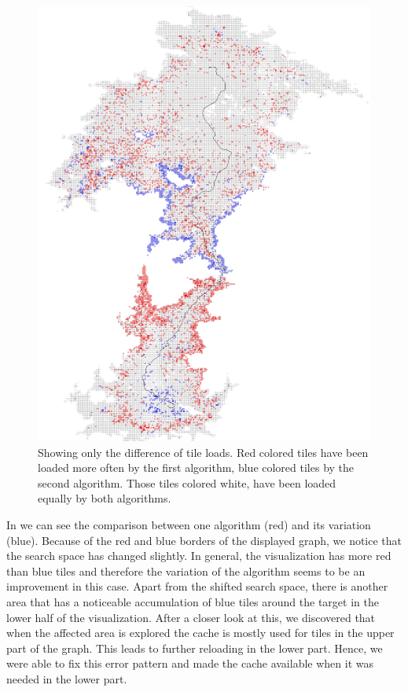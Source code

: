 \documentclass
[
    paper = a4,
    pagesize,
    12 pt,
    twoside,                       %
    open = right,
    DIV = calc,
    BCOR = 0 mm,                   %
    bibtotoc
]
{scrbook}
\begin{document}
\begin{figure}
    \includegraphics[width=\textwidth]{Images/vis-compare-colored.png}
\caption[]{Showing only the difference of tile loads. Red colored tiles have been loaded more often by the first algorithm, blue colored tiles by the second algorithm. Those tiles colored white, have been loaded equally by both algorithms.}
\label{fig:difference}
\end{figure}

In   we can see the comparison between one algorithm (red) and its variation (blue).
Because of the red and blue borders of the displayed graph, we notice that the search space has changed slightly.
In general, the visualization has more red than blue tiles and therefore the variation of the algorithm seems to be an improvement in this case.
Apart from the shifted search space, there is another area that has a noticeable accumulation of blue tiles around the target in the lower half of the visualization.
After a closer look at this, we discovered that when the affected area is explored the cache is mostly used for tiles in the upper part of the graph.
This leads to further reloading in the lower part.
Hence, we were able to fix this error pattern and made the cache available when it was needed in the lower part.
\end{document}
